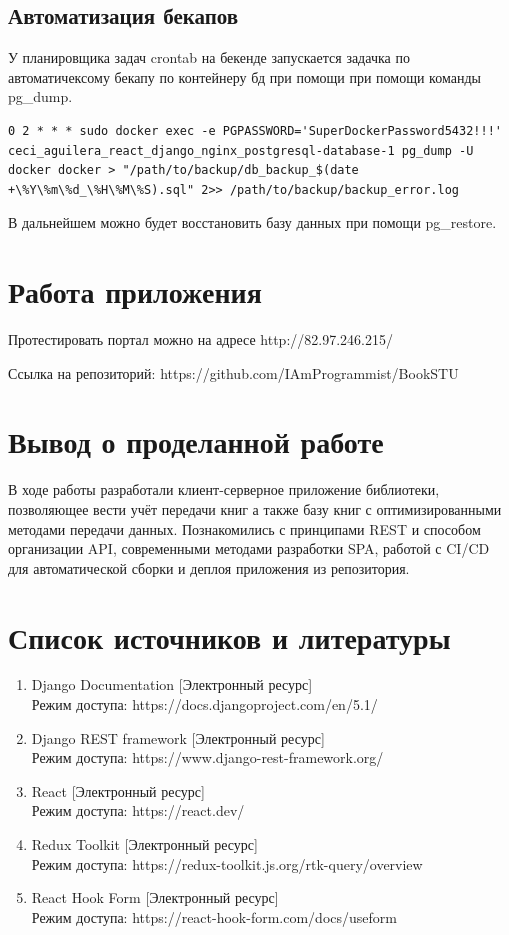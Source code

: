 \documentclass[a4paper,14pt]{extarticle}
\begin{document}
\subsection{Автоматизация бекапов}
У планировщика задач crontab на бекенде запускается задачка по автоматичексому бекапу
по контейнеру бд при помощи при помощи команды pg\_dump. 

\begin{verbatim}
0 2 * * * sudo docker exec -e PGPASSWORD='SuperDockerPassword5432!!!' ceci_aguilera_react_django_nginx_postgresql-database-1 pg_dump -U docker docker > "/path/to/backup/db_backup_$(date +\%Y\%m\%d_\%H\%M\%S).sql" 2>> /path/to/backup/backup_error.log
\end{verbatim}

В дальнейшем можно будет восстановить
базу данных при помощи pg\_restore.

\section{Работа приложения}

Протестировать портал можно на адресе http://82.97.246.215/

Ссылка на репозиторий: https://github.com/IAmProgrammist/BookSTU

\section{Вывод о проделанной работе}
В ходе работы разработали клиент-серверное приложение библиотеки, позволяющее
вести учёт передачи книг а также базу книг с оптимизированными методами передачи
данных. Познакомились с принципами REST и способом организации API, 
современными методами разработки SPA, работой с CI/CD для автоматической сборки
и деплоя приложения из репозитория.
\newpage

\section{Список источников и литературы}
\begin{enumerate}
    \item Django Documentation [Электронный ресурс] \\Режим доступа: https://docs.djangoproject.com/en/5.1/
    \item Django REST framework [Электронный ресурс] \\Режим доступа: https://www.django-rest-framework.org/
    \item React [Электронный ресурс] \\Режим доступа: https://react.dev/
    \item Redux Toolkit [Электронный ресурс] \\Режим доступа: https://redux-toolkit.js.org/rtk-query/overview
    \item React Hook Form [Электронный ресурс] \\Режим доступа: https://react-hook-form.com/docs/useform
\end{enumerate}
\end{document}
